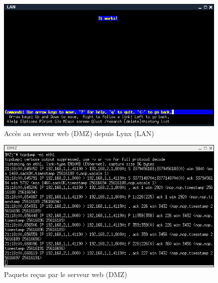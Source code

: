 \documentclass[frenchb, 11pt]{article}
\begin{document}
\begin{figure}[h!]
	\centering
	\includegraphics[scale=0.68]{sch3LAN.png}
	\caption{Accès au serveur web (DMZ) depuis Lynx (LAN)}
\end{figure}
\newpage

\begin{figure}[h!]
	\centering
	\includegraphics[scale=0.68]{sch3DMZ.png}
	\caption{Paquets reçus par le serveur web (DMZ)}
\end{figure}
\newpage

\begin{thebibliography}{5}
\end{thebibliography}
\end{document}
